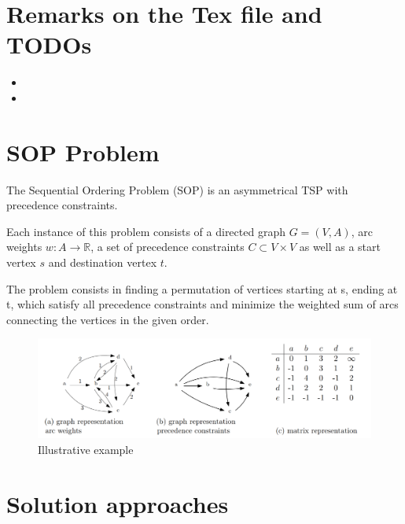 \documentclass[]{article}
\begin{document}
    \maketitle
    \tableofcontents



    \section{Remarks on the Tex file and TODOs}

    \begin{itemize}
    	\item {}
  		\item {}
    \end{itemize}

    \section{SOP Problem}

    The Sequential Ordering Problem (SOP) is an asymmetrical TSP with precedence constraints. 

    Each instance of this problem consists of a directed graph $G=(V, A)$, arc weights $w: A \rightarrow \mathbb{R}$, a set of precedence constraints $C \subset V \times V$ as well as a start vertex $s$ and destination vertex $t$.

    The problem consists in finding a permutation of vertices starting at s, ending at t, which satisfy all precedence constraints and minimize the weighted sum of arcs connecting the vertices in the given order. \cite{libralesso2019tree}

    \begin{figure}[hbt]
    	\includegraphics[width=\textwidth]{files/graphic_sop_prob.png}
    	\centering
    	\caption{Illustrative example \cite{libralesso2019tree}}
    \end{figure}



    \section{Solution approaches}
\end{document}

